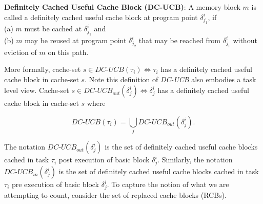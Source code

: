 \begin{definition}
\textbf{Definitely Cached Useful Cache Block (DC-UCB)}: A memory block $m$ is called a definitely cached useful cache block at program point \begin{math}\delta_{j_{1}}^{i}\end{math}, if \\(a) $m$ must be cached at \begin{math}\delta_{j_{1}}^{i}\end{math} and \\(b) $m$ may be reused at program point \begin{math}\delta_{j_{2}}^{i}\end{math} that may be reached from \begin{math}\delta_{j_{1}}^{i}\end{math} without eviction of $m$ on this path.
\end{definition}

\noindent More formally, cache-set \begin{math}s \in \textit{DC-UCB}(\tau_{i}) \Leftrightarrow \tau_{i}\end{math} has a definitely cached useful cache block in cache-set $s$.  Note this definition of \textit{DC-UCB} also embodies a task level view.  Cache-set \begin{math}s \in \textit{DC-UCB}_{out}(\delta_{j}^{i}) \Leftrightarrow \delta_{j}^{i}\end{math} has a definitely cached useful cache block in cache-set $s$ where

\begin{equation}\label{eqn:dcucb-task}
    \textit{DC-UCB}(\tau_{i}) = \bigcup_{j} \textit{DC-UCB}_{out}(\delta_{j}^{i}).
\end{equation}

\noindent The notation
\begin{math}\textit{DC-UCB}_{out}(\delta_{j}^{i})\end{math} is the set of definitely cached useful cache blocks cached in task \begin{math}\tau_{i}\end{math} post execution of basic block \begin{math}\delta_{j}^{i}\end{math}.  Similarly, the notation \begin{math}\textit{DC-UCB}_{in}(\delta_{j}^{i})\end{math} is the set of definitely cached useful cache blocks cached in task \begin{math}\tau_{i}\end{math} pre execution of basic block \begin{math}\delta_{j}^{i}\end{math}. To capture the notion of what we are attempting to count, consider the set of replaced cache blocks (RCBs).


